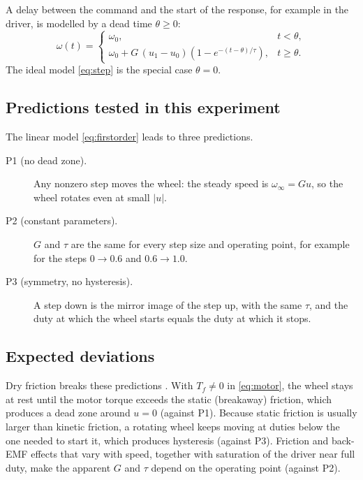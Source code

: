 A delay between the command and the start of the response, for example in the driver, is modelled by a dead time $\theta\ge0$:
\begin{equation}
\omega(t)=
\begin{cases}
\omega_0, & t<\theta,\\
\omega_0+G\,(u_1-u_0)\left(1-e^{-(t-\theta)/\tau}\right), & t\ge\theta.
\end{cases}
\label{eq:fopdt}
\end{equation}
The ideal model \eqref{eq:step} is the special case $\theta=0$.

\subsection{Predictions tested in this experiment}
The linear model \eqref{eq:firstorder} leads to three predictions.
\begin{description}
\item[P1 (no dead zone).] Any nonzero step moves the wheel: the steady speed is $\omega_\infty=Gu$, so the wheel rotates even at small $|u|$.
\item[P2 (constant parameters).] $G$ and $\tau$ are the same for every step size and operating point, for example for the steps $0\to0.6$ and $0.6\to1.0$.
\item[P3 (symmetry, no hysteresis).] A step down is the mirror image of the step up, with the same $\tau$, and the duty at which the wheel starts equals the duty at which it stops.
\end{description}

\subsection{Expected deviations}
Dry friction breaks these predictions \parencite{armstronghelouvry1994SurveyModelsAnalysis}. With $T_f\neq0$ in \eqref{eq:motor}, the wheel stays at rest until the motor torque exceeds the static (breakaway) friction, which produces a dead zone around $u=0$ (against P1). Because static friction is usually larger than kinetic friction, a rotating wheel keeps moving at duties below the one needed to start it, which produces hysteresis (against P3). Friction and back-EMF effects that vary with speed, together with saturation of the driver near full duty, make the apparent $G$ and $\tau$ depend on the operating point (against P2).
